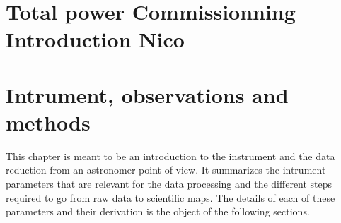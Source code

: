 \documentclass[a4paper, 11pt]{report}
\begin{document}


\newpage
%
%



\chapter{Total power Commissionning Introduction {\color{blue} Nico}}
\label{se:intro}


\clearpage
\chapter{Intrument, observations and methods}
\label{se:chap_instru_obs_methods}

This chapter is meant to be an introduction to the instrument and the data
reduction from an astronomer point of view. It summarizes the intrument
parameters that are relevant for the data processing and the different steps
required to go from raw data to scientific maps. The details of each of these
parameters and their derivation is the object of the following sections.






\end{document}
